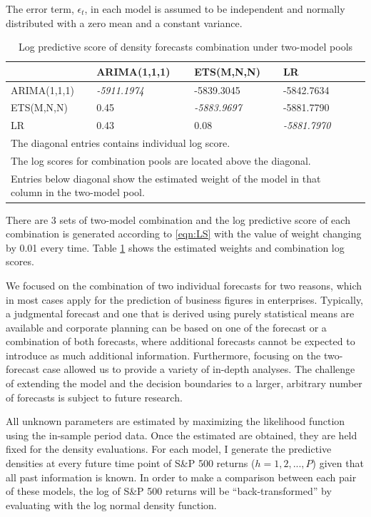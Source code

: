 \documentclass{monashthesis}
\begin{document}
The error term, \(\epsilon_t\), in each model is assumed to be independent and normally distributed with a zero mean and a constant variance.

\begin{table}[ht]
  \centering
  \caption{Log predictive score of density forecasts combination under two-model pools}
    \begin{tabular}{llllll}
    \toprule
          & ARIMA(1,1,1) & ETS(M,N,N) & LR \\
    \midrule
    ARIMA(1,1,1) & \textit{-5911.1974} & -5839.3045 & -5842.7634 \\
    ETS(M,N,N) & 0.45  & \textit{-5883.9697} & -5881.7790 \\
    LR & 0.43  & 0.08  & \textit{-5881.7970} \\
    \bottomrule
    \multicolumn{4}{l}{\footnotesize The diagonal entries contains individual log score.}\\
    \multicolumn{4}{l}{\footnotesize The log scores for combination pools are located above the diagonal.}\\
    \multicolumn{4}{l}{\footnotesize Entries below diagonal show the estimated weight of the model in that column in the two-model pool.}\\
    \end{tabular}
  \label{tab:2}
\end{table}

There are 3 sets of two-model combination and the log predictive score of each combination is generated according to \ref{eqn:LS} with the value of weight changing by 0.01 every time. Table \ref{tab:2} shows the estimated weights and combination log scores.

We focused on the combination of two individual forecasts for two reasons, which in most cases apply for the prediction of business figures in enterprises. Typically, a judgmental forecast and one that is derived using purely statistical means are available and corporate planning can be based on one of the forecast or a combination of both forecasts, where additional forecasts cannot be expected to introduce as much additional information. Furthermore, focusing on the two-forecast case allowed us to provide a variety of in-depth analyses. The challenge of extending the model and the decision boundaries to a larger, arbitrary number of forecasts is subject to future research.

All unknown parameters are estimated by maximizing the likelihood function using the in-sample period data. Once the estimated are obtained, they are held fixed for the density evaluations. For each model, I generate the predictive densities at every future time point of S\&P 500 returns (\(h=1,2,...,P\)) given that all past information is known. In order to make a comparison between each pair of these models, the log of S\&P 500 returns will be ``back-transformed'' by evaluating with the log normal density function.
\end{document}

